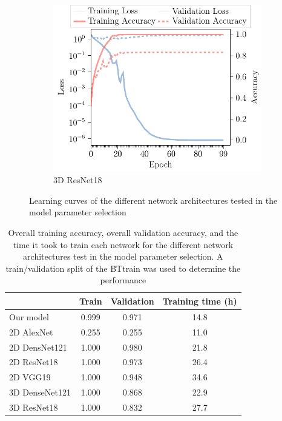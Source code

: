 \begin{subappendices}
\begin{figure}
\begin{subfigure}[t]{\modelplotwidth}
    \includegraphics[width=\textwidth]{Figures/Appendix/ResNet_3D.pdf}
    \caption{3D ResNet18}\label{fig:ResNet3D}
\end{subfigure}

\caption{Learning curves of the different network architectures tested in the model parameter selection}\label{fig:modellearningcurves}
\end{figure}

\begin{table}[H]
 \centering
  \begin{tabular}{L{2.5cm}S[table-format=1.3]S[table-format=1.3]S[table-format=2.1]}
      \toprule
& {\textbf{Train}} & {\textbf{Validation}} & {\textbf{Training time (h)}}\\
    \midrule
    Our model & 0.999 & 0.971 & 14.8\\
    2D AlexNet & 0.255 & 0.255 & 11.0\\
    2D DensNet121 & 1.000 & 0.980 & 21.8\\
    2D ResNet18 & 1.000 & 0.973 & 26.4\\
    2D VGG19 & 1.000 & 0.948 & 34.6\\
    3D DenseNet121 & 1.000 & 0.868 & 22.9\\
    3D ResNet18 & 1.000 & 0.832 & 27.7\\
  \bottomrule
  \end{tabular}
  \caption{Overall training accuracy, overall validation accuracy, and the time it took to train each network for the different network architectures test in the model parameter selection.
  A train/validation split of the \gls{BTtrain} was used to determine the performance}\label{tab:modelaccuracies}


\end{table}
\end{subappendices}
